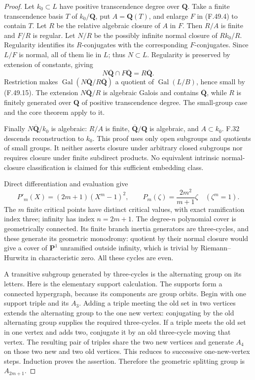 \begin{proof}
Let \(k_0\subset L\) have positive transcendence degree over
\(\mathbf Q\). Take a finite transcendence basis \(T\) of
\(k_0/\mathbf Q\), put \(A=\mathbf Q(T)\), and enlarge \(F\)
in (F.49.4) to contain \(T\).
Let \(R\) be the relative algebraic closure of \(A\) in \(F\).
Then \(R/A\) is finite and \(F/R\) is regular.
Let \(N/R\) be the possibly infinite normal closure of \(Rk_0/R\).
Regularity identifies its \(R\)-conjugates with the corresponding
\(F\)-conjugates. Since \(L/F\) is normal, all of them lie in \(L\);
thus \(N\subset L\).
Regularity is preserved by extension of constants, giving
\[
 N\overline{\mathbf Q}\cap F\overline{\mathbf Q}
                         =R\overline{\mathbf Q}.
 \tag{F.49.16}
\]
Restriction makes
\(\operatorname{Gal}(N\overline{\mathbf Q}/R\overline{\mathbf Q})\)
a quotient of \(\operatorname{Gal}(L/B)\), hence small by
(F.49.15). The extension \(N\overline{\mathbf Q}/R\) is algebraic
Galois and contains \(\overline{\mathbf Q}\), while \(R\) is
finitely generated over \(\mathbf Q\) of positive transcendence
degree. The small-group case and the core theorem apply to it.

Finally \(N\overline{\mathbf Q}/k_0\) is algebraic:
\(R/A\) is finite, \(\overline{\mathbf Q}/\mathbf Q\) is algebraic,
and \(A\subset k_0\).
F.32 descends reconstruction to \(k_0\).
This proof uses only open subgroups and quotients of small groups.
It neither asserts closure under arbitrary closed subgroups nor
requires closure under finite subdirect products.
No equivalent intrinsic normal-closure classification is claimed
for this sufficient embedding class.

Direct differentiation and evaluation give
\[
 P'_m(X)=(2m+1)(X^m-1)^2,\qquad
 P_m(\zeta)=\frac{2m^2}{m+1}\zeta\quad(\zeta^m=1).
 \tag{F.49.17}
\]
The \(m\) finite critical points have distinct critical values,
with exact ramification index three; infinity has index
\(n=2m+1\). The degree-\(n\) polynomial cover is geometrically
connected. Its finite branch inertia generators are three-cycles,
and these generate its geometric monodromy: quotient by their
normal closure would give a cover of \(\mathbf P^1\) unramified
outside infinity, which is trivial by Riemann--Hurwitz in
characteristic zero. All these cycles are even.

A transitive subgroup generated by three-cycles is the alternating
group on its letters. Here is the elementary support calculation.
The supports form a connected hypergraph, because its components
are group orbits. Begin with one support triple and its \(A_3\).
Adding a triple meeting the old set in two vertices extends the
alternating group to the one new vertex: conjugating by the old
alternating group supplies the required three-cycles.
If a triple meets the old set in one vertex and adds two, conjugate
it by an old three-cycle moving that vertex. The resulting pair
of triples share the two new vertices and generate \(A_4\) on
those two new and two old vertices. This reduces to successive
one-new-vertex steps. Induction proves the assertion.
Therefore the geometric splitting group is \(A_{2m+1}\).


\end{proof}
